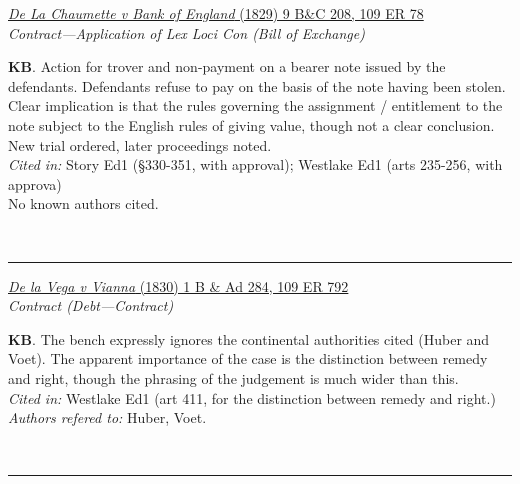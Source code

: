 \documentclass[twoside]{article}
\begin{document}
        \begin{small}
        \begin{center}
        \href{https://heinonline.org/HOL/P?h=hein.engrep/engrf0109&i=82}{\textit{De La Chaumette v Bank of England} (1829) 9 B\&C 208, 109 ER 78} \label{43} \\ 
\textit{Contract---Application of Lex Loci Con (Bill of Exchange)}\\
        \end{center}
        \textbf{KB}. Action for trover and non-payment on a bearer note issued by the defendants. Defendants refuse to pay on the basis of the note having been stolen. Clear implication is that the rules governing the assignment / entitlement to the note subject to the English rules of giving value, though not a clear conclusion. New trial ordered, later proceedings noted.\\\textit{Cited in: }Story Ed1 (§330-351, with approval); Westlake Ed1 (arts 235-256, with approva)\\No known authors cited.
        \end{small}\\
        \rule{\textwidth}{0.5pt}
        

        \begin{small}
        \begin{center}
        \href{https://heinonline.org/HOL/P?h=hein.engrep/engrf0109&i=796}{\textit{De la Vega v Vianna} (1830) 1 B \& Ad 284, 109 ER 792} \label{54} \\ 
\textit{Contract (Debt---Contract)}\\
        \end{center}
        \textbf{KB}. The bench expressly ignores the continental authorities cited (Huber and Voet). The apparent importance of the case is the distinction between remedy and right, though the phrasing of the judgement is much wider than this.\\\textit{Cited in: }Westlake Ed1 (art 411, for the distinction between remedy and right.)\\\textit{Authors refered to: }Huber, Voet.
        \end{small}\\
        \rule{\textwidth}{0.5pt}
        
\end{document}
